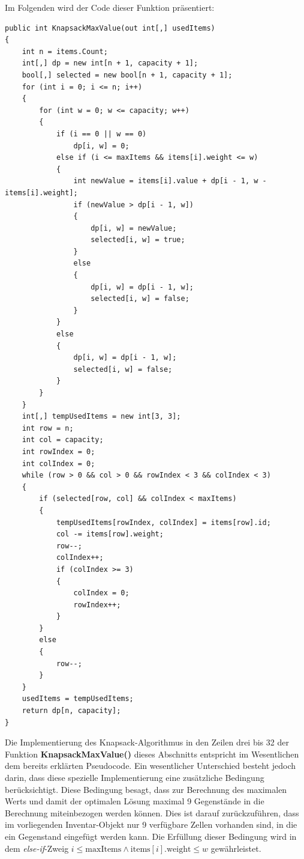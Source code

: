 Im Folgenden wird der Code dieser Funktion präsentiert:
\begin{lstlisting}[style=csharp, caption={Knapsack Algorithmus / Item Backtracking}, label=code:startKnapsack]
public int KnapsackMaxValue(out int[,] usedItems)
{
    int n = items.Count;
    int[,] dp = new int[n + 1, capacity + 1];
    bool[,] selected = new bool[n + 1, capacity + 1];
    for (int i = 0; i <= n; i++)
    {
        for (int w = 0; w <= capacity; w++)
        {
            if (i == 0 || w == 0)
                dp[i, w] = 0;
            else if (i <= maxItems && items[i].weight <= w)
            {
                int newValue = items[i].value + dp[i - 1, w - items[i].weight];
                if (newValue > dp[i - 1, w])
                {
                    dp[i, w] = newValue;
                    selected[i, w] = true;
                }
                else
                {
                    dp[i, w] = dp[i - 1, w];
                    selected[i, w] = false;
                }
            }
            else
            {
                dp[i, w] = dp[i - 1, w];
                selected[i, w] = false;
            }
        }
    }
    int[,] tempUsedItems = new int[3, 3];
    int row = n;
    int col = capacity;
    int rowIndex = 0;
    int colIndex = 0;
    while (row > 0 && col > 0 && rowIndex < 3 && colIndex < 3)
    {
        if (selected[row, col] && colIndex < maxItems)
        {
            tempUsedItems[rowIndex, colIndex] = items[row].id;
            col -= items[row].weight;
            row--;
            colIndex++;
            if (colIndex >= 3)
            {
                colIndex = 0;
                rowIndex++;
            }
        }
        else
        {
            row--;
        }
    }
    usedItems = tempUsedItems;
    return dp[n, capacity];
}
\end{lstlisting}
Die Implementierung des Knapsack-Algorithmus in den Zeilen drei bis 32 der Funktion \textbf{KnapsackMaxValue()} dieses
Abschnitts entspricht im Wesentlichen dem bereits erklärten Pseudocode. Ein wesentlicher Unterschied besteht jedoch darin,
dass diese spezielle Implementierung eine zusätzliche Bedingung berücksichtigt. Diese Bedingung besagt, dass zur Berechnung
des maximalen Werts und damit der optimalen Lösung maximal 9 Gegenstände in die Berechnung miteinbezogen werden können.
Dies ist darauf zurückzuführen, dass im vorliegenden Inventar-Objekt nur 9 verfügbare Zellen vorhanden sind, in die ein
Gegenstand eingefügt werden kann. Die Erfüllung dieser Bedingung wird in dem
\textit{else-if}-Zweig $i \leq \text{maxItems} \land \text{items}[i].\text{weight} \leq w$ gewährleistet.


